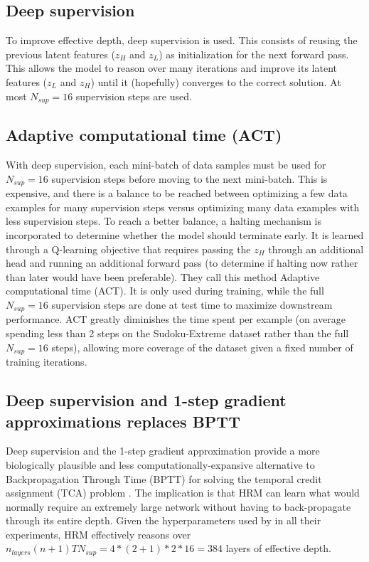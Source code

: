 \documentclass{article}
\theoremstyle{plain}
\theoremstyle{definition}
\theoremstyle{remark}
\begin{document}
\subsection{Deep supervision}

To improve effective depth, deep supervision is used. This consists of reusing the previous latent features ($z_H$ and $z_L$) as initialization for the next forward pass. This allows the model to reason over many iterations and improve its latent features ($z_L$ and $z_H$) until it (hopefully) converges to the correct solution. At most $N_{sup}=16$ supervision steps are used.

\subsection{Adaptive computational time (ACT)}

With deep supervision, each mini-batch of data samples must be used for $N_{sup}=16$ supervision steps before moving to the next mini-batch. This is expensive, and there is a balance to be reached between optimizing a few data examples for many supervision steps versus optimizing many data examples with less supervision steps. To reach a better balance, a halting mechanism is incorporated to determine whether the model should terminate early. It is learned through a Q-learning objective that requires passing the $z_H$ through an additional head and running an additional forward pass (to determine if halting now rather than later would have been preferable). They call this method Adaptive computational time (ACT). It is only used during training, while the full $N_{sup}=16$ supervision steps are done at test time to maximize downstream performance. ACT greatly diminishes the time spent per example (on average spending less than 2 steps on the Sudoku-Extreme dataset rather than the full $N_{sup}=16$ steps), allowing more coverage of the dataset given a fixed number of training iterations.

\subsection{Deep supervision and 1-step gradient approximations replaces BPTT}

Deep supervision and the 1-step gradient approximation provide a more biologically plausible and less computationally-expansive alternative to Backpropagation Through Time (BPTT) \citep{werbos1974beyond, rumelhart1985learning, lecun1985procedure} for solving the temporal credit assignment (TCA) \citep{rumelhart1985learning, werbos1988generalization, elman1990finding} problem \citep{lillicrap2019backpropagation}. The implication is that HRM can learn what would normally require an extremely large network without having to back-propagate through its entire depth. Given the hyperparameters used by \citet{jang2023hierarchical} in all their experiments, HRM effectively reasons over $n_{layers}(n+1)TN_{sup}=4*(2+1)*2*16=384$ layers of effective depth.
\end{document}
